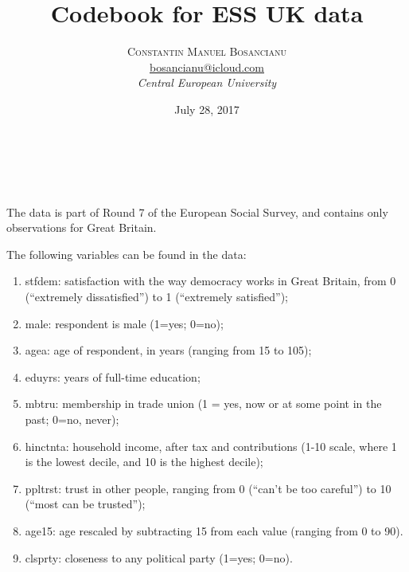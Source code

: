 \documentclass[a4paper, 11pt]{article}
\title{\textbf{Codebook for ESS UK data}}
\author{\textsc{Constantin Manuel Bosancianu}\\ %
  \href{mailto:bosancianu@icloud.com}{bosancianu@icloud.com}\\
  \textit{Central European University}} %
\date{July 28, 2017} %
\makeatletter
\renewcommand{\maketitle}{
  \begin{flushleft}
    {\Large\@title}\\
    \vspace{10pt}
    {\large\@author}\\
    \vspace{10pt}
    {\@date}
    \vspace{40pt}
  \end{flushleft}
}
\makeatother
\begin{document}
\maketitle

The data is part of Round 7 of the European Social Survey, and contains only observations for Great Britain.

The following variables can be found in the data:

\begin{enumerate}
\item \textsf{stfdem}: satisfaction with the way democracy works in Great Britain, from 0 (``extremely dissatisfied'') to 1 (``extremely satisfied''); 
\item \textsf{male}: respondent is male (1=yes; 0=no);
\item \textsf{agea}: age of respondent, in years (ranging from 15 to 105);
\item \textsf{eduyrs}: years of full-time education;
\item \textsf{mbtru}: membership in trade union (1 = yes, now or at some point in the past; 0=no, never);
\item \textsf{hinctnta}: household income, after tax and contributions (1-10 scale, where 1 is the lowest decile, and 10 is the highest decile);
\item \textsf{ppltrst}: trust in other people, ranging from 0 (``can't be too careful'') to 10 (``most can be trusted'');
\item \textsf{age15}: age rescaled by subtracting 15 from each value (ranging from 0 to 90).
\item \textsf{clsprty}: closeness to any political party (1=yes; 0=no).
\end{enumerate}
\end{document}
